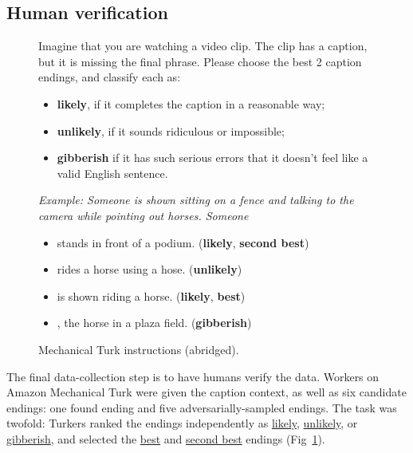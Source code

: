 \documentclass[11pt,a4paper]{article}
\begin{document}
\subsection{Human verification}\label{subsec:human}
\begin{figure}
    {
    \begin{framed}
    \small
    Imagine that you are watching a video clip. The clip has a caption, but it is missing the final phrase. Please choose the best 2 caption endings, and classify each as:
    \begin{itemize}[wide, labelwidth=!,labelindent=0pt,noitemsep,topsep=2pt]
    \item \textbf{likely}, if it completes the caption in a reasonable way;
    \item \textbf{unlikely}, if it sounds ridiculous or impossible;
    \item \textbf{gibberish} if it has such serious errors that it doesn't feel like a valid English sentence.
    \end{itemize}
\vspace{2pt}
\emph{Example: Someone is shown sitting on a fence and talking to the camera while pointing out horses. Someone}
\begin{itemize}[wide, labelwidth=!,labelindent=0pt,noitemsep,topsep=2pt]
    \item stands in front of a podium. (\textbf{likely}, \textbf{second best})
    \item rides a horse using a hose. (\textbf{unlikely})
    \item is shown riding a horse. (\textbf{likely}, \textbf{best})
    \item , the horse in a plaza field. (\textbf{gibberish})
\end{itemize}
    \end{framed}}
    \vspace*{-3mm}\caption{Mechanical Turk instructions (abridged).}\vspace{-1mm}
    \label{fig:instructions}
\end{figure}

The final data-collection step is to have humans verify the data. Workers on Amazon Mechanical Turk were given the caption context, as well as six candidate endings: one found ending and five adversarially-sampled endings. The task was twofold: Turkers ranked the endings independently as \underline{likely}, \underline{unlikely}, or \underline{gibberish}, and 
selected the 
\underline{best} and \underline{second best} endings (Fig~\ref{fig:instructions}). 
\end{document}
